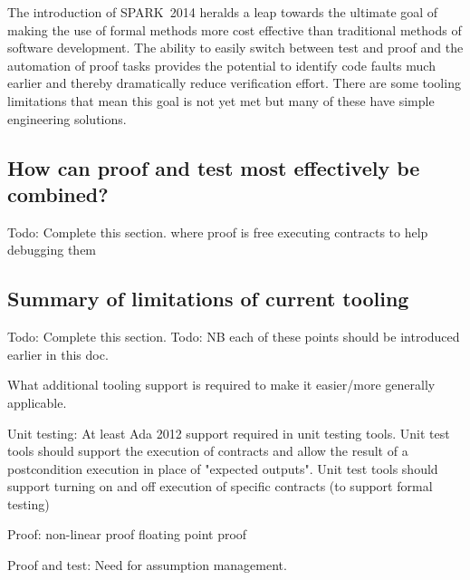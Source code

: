 \documentclass{llncs}
\newcommand{\newspark}{SPARK~2014\xspace}
\begin{document}
The introduction of \newspark heralds a leap towards the ultimate goal of making the use of formal methods more cost effective than traditional methods of software development. The ability to easily switch between test and proof and the automation of proof tasks provides the potential to identify code faults much earlier and thereby dramatically reduce verification effort. There are some tooling limitations that mean this goal is not yet met but many of these have simple engineering solutions.

\subsection{How can proof and test most effectively be combined?}
Todo: Complete this section.
where proof is free
executing contracts to help debugging them

\subsection{Summary of limitations of current tooling}

Todo: Complete this section.
Todo: NB each of these points should be introduced earlier in this doc.

What additional tooling support is required to make it easier/more
generally applicable.

Unit testing:
At least Ada 2012 support required in unit testing tools.
Unit test tools should support the execution of contracts and allow the result of a postcondition execution in place of "expected outputs".
Unit test tools should support turning on and off execution of specific contracts (to support formal testing)

Proof:
non-linear proof
floating point proof

Proof and test:
Need for assumption management.




\end{document}
